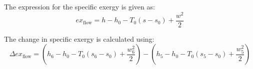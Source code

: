 The expression for the specific exergy is given as:  
\[
ex_{\text{flow}} = h - h_0 - T_0(s - s_0) + \frac{w^2}{2}
\]

The change in specific exergy is calculated using:  
\[
\Delta ex_{\text{flow}} = \left(h_6 - h_0 - T_0(s_6 - s_0) + \frac{w_6^2}{2}\right) - \left(h_5 - h_0 - T_0(s_5 - s_0) + \frac{w_5^2}{2}\right)
\]